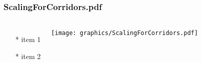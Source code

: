 \begin{frame} \frametitle{ScalingForCorridors.pdf}
    \begin{columns}[c]
        \begin{itemize}
            \item[*] item 1
            \item[*] item 2
        \end{itemize}
        \begin{minipage}{\linewidth}
            \begin{center}
            \texttt{[image: graphics/ScalingForCorridors.pdf]}
            \label{gfx:ScalingForCorridors.pdf}
            \end{center}
        \end{minipage}
    \end{columns}
\end{frame}
